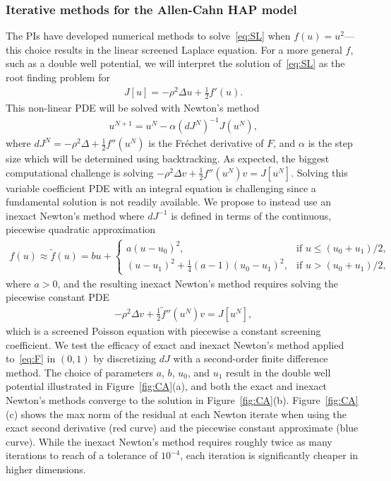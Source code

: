 \subsubsection{Iterative methods for the Allen-Cahn HAP model}
\label{subsec:AC}

The PIs have developed numerical methods to solve~\eqref{eq:SL} when
$f(u) = u^2$---this choice results in the linear screened Laplace
equation. For a more general $f$, such as a double well potential, we
will interpret the solution of~\eqref{eq:SL} as the root finding problem
for
\begin{align}
  \label{eq:F}
  J[u] = -\rho^2 \Delta u + \tfrac{1}{2}f'(u).
\end{align}
This non-linear PDE will be solved with Newton's method
\begin{align*}
  u^{N+1} = u^{N} - \alpha (dJ^N)^{-1} J(u^N),
\end{align*}
where $dJ^N = -\rho^2 \Delta + \tfrac{1}{2}f''(u^N)$ is the Fr\'{e}chet derivative
of $F$, and $\alpha$ is the step size which will be determined using
backtracking. As expected, the biggest computational challenge is
solving $- \rho^2 \Delta v + \tfrac{1}{2}f''(u^{N}) v = J[u^N]$. Solving this
variable coefficient PDE with an integral equation is challenging since
a fundamental solution is not readily available. We propose to instead
use an inexact Newton's method where $dJ^{-1}$ is defined in terms of
the continuous, piecewise quadratic approximation
\begin{align*}
  f(u) \approx \tilde{f}(u) = bu + \begin{cases}
    a(u - u_0)^2, &\mbox{if } u \leq (u_0 + u_1)/2, \\
    (u - u_1)^2 + \tfrac{1}{4}(a-1)(u_0-u_1)^2 , &\mbox{if } u > (u_0 + u_1)/2,
  \end{cases}
\end{align*}
where $a>0$, and the resulting inexact Newton's method requires solving
the piecewise constant PDE
\begin{align}
  \label{eq:screenedPoisson}
  -\rho^2 \Delta v + \tfrac{1}{2}\tilde{f}''(u^{N})v = J[u^N],
\end{align}
which is a screened Poisson equation with piecewise a constant screening
coefficient. We test the efficacy of exact and inexact Newton's method
applied to~\eqref{eq:F} in $(0,1)$ by discretizing $dJ$ with a
second-order finite difference method. The choice of parameters $a$,
$b$, $u_0$, and $u_1$ result in the double well potential illustrated in
Figure~\ref{fig:CA}(a), and both the exact and inexact Newton's methods
converge to the solution in Figure~\ref{fig:CA}(b).
Figure~\ref{fig:CA}(c) shows the max norm of the residual at each Newton
iterate when using the exact second derivative (red curve) and the
piecewise constant approximate (blue curve). While the inexact Newton's
method requires roughly twice as many iterations to reach of a tolerance
of $10^{-4}$, each iteration is significantly cheaper in higher
dimensions.

